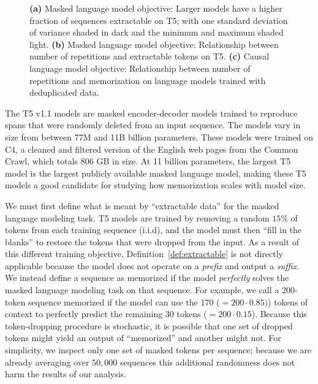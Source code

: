 \begin{figure}[t]
    \vskip-5pt
    \caption{
    \textbf{(a)}
    Masked language model objective: Larger models have a higher fraction of sequences extractable on T5;
    with one standard deviation of variance shaded in dark and the minimum and maximum shaded light.
    \textbf{(b)}
    Masked language model objective: Relationship between number of repetitions and extractable tokens on T5.
    \textbf{(c)}
    Causal language model objective: Relationship between number of repetitions and memorization on language models trained with deduplicated data.
    }
    \label{fig:other-models}
\end{figure}

The T5 v1.1 models are masked encoder-decoder models trained to reproduce spans that were randomly deleted from an input sequence. The models vary in size from between 77M and 11B billion parameters.
%
These models were trained on C4, a cleaned and filtered version of the English web pages from the Common Crawl, which totals 806 GB in size.
%
At 11 billion parameters, the largest T5 model is the largest publicly available masked language model, making these T5 models a good candidate for studying how memorization scales with model size.

We must first define what is meant by ``extractable data''
for the masked language modeling task.
T5 models are trained by removing a random $15\%$ of tokens from each training sequence (i.i.d), and the model must then
``fill in the blanks'' to restore the tokens that were dropped from the input.
%
%
As a result of this different training objective,
Definition~\ref{def:extractable} is not directly applicable because the model does not operate on a \emph{prefix} and output a \emph{suffix}.
We instead define a sequence as memorized if the model \emph{perfectly} solves the masked language modeling task on that sequence.
%
For example, we call a 200-token sequence memorized if the model can
use the 170 ($=200 \cdot 0.85)$) tokens of context to perfectly predict the remaining 30 tokens ($=200 \cdot 0.15$).
%
Because this token-dropping procedure is stochastic, it is possible that one set of dropped tokens might yield
an output of ``memorized'' and another might not.
%
For simplicity, we inspect only one set of masked tokens per sequence; because we are already averaging over
$50,000$ sequences this additional randomness does not harm the results of our analysis.

